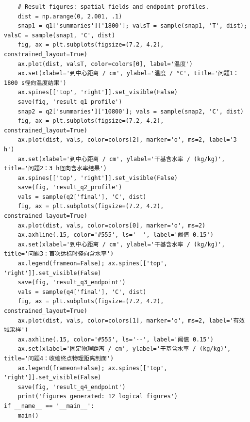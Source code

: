 \begin{verbatim}
    # Result figures: spatial fields and endpoint profiles.
    dist = np.arange(0, 2.001, .1)
    snap1 = q1['summaries']['1800']; valsT = sample(snap1, 'T', dist); valsC = sample(snap1, 'C', dist)
    fig, ax = plt.subplots(figsize=(7.2, 4.2), constrained_layout=True)
    ax.plot(dist, valsT, color=colors[0], label='温度')
    ax.set(xlabel='到中心距离 / cm', ylabel='温度 / °C', title='问题1：1800 s径向温度结果')
    ax.spines[['top', 'right']].set_visible(False)
    save(fig, 'result_q1_profile')
    snap2 = q2['summaries']['10800']; vals = sample(snap2, 'C', dist)
    fig, ax = plt.subplots(figsize=(7.2, 4.2), constrained_layout=True)
    ax.plot(dist, vals, color=colors[2], marker='o', ms=2, label='3 h')
    ax.set(xlabel='到中心距离 / cm', ylabel='干基含水率 / (kg/kg)', title='问题2：3 h径向含水率结果')
    ax.spines[['top', 'right']].set_visible(False)
    save(fig, 'result_q2_profile')
    vals = sample(q2['final'], 'C', dist)
    fig, ax = plt.subplots(figsize=(7.2, 4.2), constrained_layout=True)
    ax.plot(dist, vals, color=colors[0], marker='o', ms=2)
    ax.axhline(.15, color='#555', ls='--', label='阈值 0.15')
    ax.set(xlabel='到中心距离 / cm', ylabel='干基含水率 / (kg/kg)', title='问题3：首次达标时径向含水率')
    ax.legend(frameon=False); ax.spines[['top', 'right']].set_visible(False)
    save(fig, 'result_q3_endpoint')
    vals = sample(q4['final'], 'C', dist)
    fig, ax = plt.subplots(figsize=(7.2, 4.2), constrained_layout=True)
    ax.plot(dist, vals, color=colors[1], marker='o', ms=2, label='有效域采样')
    ax.axhline(.15, color='#555', ls='--', label='阈值 0.15')
    ax.set(xlabel='固定物理距离 / cm', ylabel='干基含水率 / (kg/kg)', title='问题4：收缩终点物理距离剖面')
    ax.legend(frameon=False); ax.spines[['top', 'right']].set_visible(False)
    save(fig, 'result_q4_endpoint')
    print('figures generated: 12 logical figures')
if __name__ == '__main__':
    main()

\end{verbatim}

